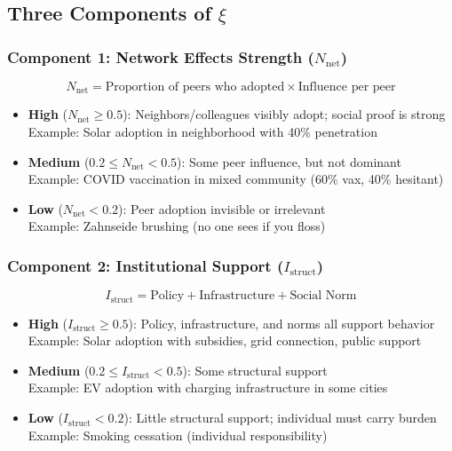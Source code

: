 \documentclass[11pt, a4paper]{article}
\begin{document}
\subsection{Three Components of $\xi$}

\subsubsection{Component 1: Network Effects Strength ($N_{\text{net}}$)}

\begin{equation}
N_{\text{net}} = \text{Proportion of peers who adopted} \times \text{Influence per peer}
\end{equation}

\begin{itemize}
    \item \textbf{High} ($N_{\text{net}} \geq 0.5$):
    Neighbors/colleagues visibly adopt; social proof is strong
    \\ Example: Solar adoption in neighborhood with 40\% penetration

    \item \textbf{Medium} ($0.2 \leq N_{\text{net}} < 0.5$):
    Some peer influence, but not dominant
    \\ Example: COVID vaccination in mixed community (60\% vax, 40\% hesitant)

    \item \textbf{Low} ($N_{\text{net}} < 0.2$):
    Peer adoption invisible or irrelevant
    \\ Example: Zahnseide brushing (no one sees if you floss)
\end{itemize}

\subsubsection{Component 2: Institutional Support ($I_{\text{struct}}$)}

\begin{equation}
I_{\text{struct}} = \text{Policy} + \text{Infrastructure} + \text{Social Norm}
\end{equation}

\begin{itemize}
    \item \textbf{High} ($I_{\text{struct}} \geq 0.5$):
    Policy, infrastructure, and norms all support behavior
    \\ Example: Solar adoption with subsidies, grid connection, public support

    \item \textbf{Medium} ($0.2 \leq I_{\text{struct}} < 0.5$):
    Some structural support
    \\ Example: EV adoption with charging infrastructure in some cities

    \item \textbf{Low} ($I_{\text{struct}} < 0.2$):
    Little structural support; individual must carry burden
    \\ Example: Smoking cessation (individual responsibility)
\end{itemize}
\end{document}
